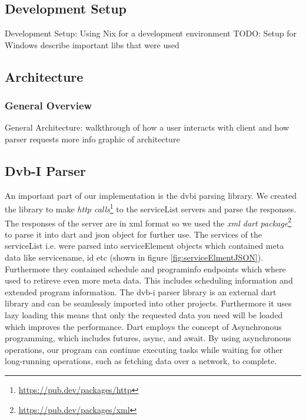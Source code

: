 \documentclass[conference]{IEEEtran}
\begin{document}
\subsection{Development Setup}\label{dev_set}

Development Setup:
Using Nix for a development environment
TODO: Setup for Windows
describe important libs that were used


\subsection{Architecture}\label{arch}

\subsubsection{General Overview}
General Architecture:
walkthrough of how a user interacts with client and how parser requests more info
graphic of architecture


\subsection{Dvb-I Parser}\label{dvbi_parser}


An important part of our implementation is the dvbi parsing library. We created the library to make \emph{http calls}\footnote{\url{https://pub.dev/packages/http}} to the serviceList servers and parse the responses. The responses of the server are in xml format so we used the \emph{xml dart package}\footnote{\url{https://pub.dev/packages/xml}} to parse it into dart and json object for further use. The services of the serviceList i.e.  were parsed into serviceElement objects which contained meta data like servicename, id etc (shown in figure \ref{fig:serviceElmentJSON}). Furthermore they contained schedule and programinfo endpoints which where used to retireve even more meta data. This includes scheduling information and extended program information. The dvb-i parser library is an external dart library and can be seamlessly imported into other projects. Furthermore it uses lazy loading this means that only the requested data you need will be loaded which improves the performance. Dart employs the concept of Asynchronous programming, which includes futures, async, and await. By using asynchronous operations, our program can continue executing tasks while waiting for other long-running operations, such as fetching data over a network, to complete.
\end{document}
